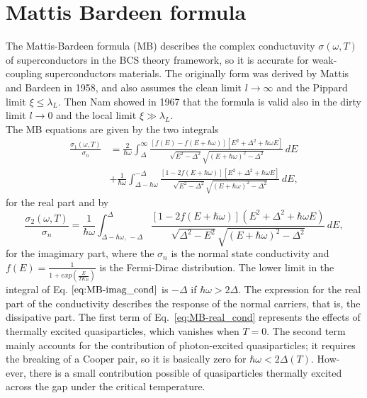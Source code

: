 \documentclass[a4paper,11pt]{book}
\begin{document}
\section{Mattis Bardeen formula}

The Mattis-Bardeen formula (MB) describes the complex conductuvity $\sigma(\omega, T)$ of superconductors in the 
BCS theory framework, so it is accurate for weak-coupling superconductors materials.
The originally form was derived by Mattis and Bardeen in 1958, and also assumes the clean
limit $l\rightarrow\infty$ and the Pippard limit $\xi \leq \lambda_L$. Then Nam showed in 1967 that
the formula is valid also in the dirty limit $l\rightarrow 0$ and the local limit $\xi \gg \lambda_L$.
\\
The MB equations are given by the two integrals
\begin{equation}
    \begin{split}
        \frac{\sigma_1(\omega, T)}{\sigma_n} &= \frac{2}{\hbar\omega} \int_{\Delta}^{\infty} \frac{\left[ f(E) - f(E + \hbar\omega) \right] \left[E^2 + \Delta^2 + \hbar\omega E \right]}{\sqrt{E^2 - \Delta^2} \sqrt{(E + \hbar\omega)^2 - \Delta^2}} \, dE \\
             & + \frac{1}{\hbar\omega} \int_{\Delta -\hbar\omega}^{-\Delta} \frac{\left[ 1 - 2f(E + \hbar\omega) \right] \left[E^2 + \Delta^2 + \hbar\omega E \right]}{\sqrt{E^2 - \Delta^2} \sqrt{(E + \hbar\omega)^2 - \Delta^2}} \, dE,
    \end{split}
\label{eq:MB-real_cond}
\end{equation}
for the real part and by
\begin{equation}
\frac{\sigma_2(\omega, T)}{\sigma_n} = \frac{1}{\hbar\omega} \int_{\Delta-\hbar\omega, \, -\Delta}^{\Delta} \frac{\left[ 1 - 2f(E + \hbar\omega) \right] \left( E^2 + \Delta^2 + \hbar\omega E \right)}{\sqrt{\Delta^2 - E^2} \sqrt{(E + \hbar\omega)^2 - \Delta^2}} \, dE,
\label{eq:MB-imag_cond}
\end{equation}
for the imagimary part, where the $\sigma_n$ is the normal state conductivity and $f(E)= \frac{1}{1 + exp(\frac{E}{TK_B})}$ is the Fermi-Dirac distribution. The lower limit in the integral of Eq.$~\ref{eq:MB-imag_cond}$ is $-\Delta$ if $\hbar \omega > 2\Delta$.
The expression for the real part of the conductivity
describes the response of the normal carriers, that is, the
dissipative part. The first term of Eq.~\ref{eq:MB-real_cond} represents the effects of
thermally excited quasiparticles, which vanishes when $T=0$.
The second term mainly accounts for the contribution of
photon-excited quasiparticles; it requires the breaking
of a Cooper pair, so it is basically zero for $\hbar \omega < 2\Delta (T)$. How-
ever, there is a small contribution possible of quasiparticles thermally excited across the gap under the critical temperature.
\end{document}
